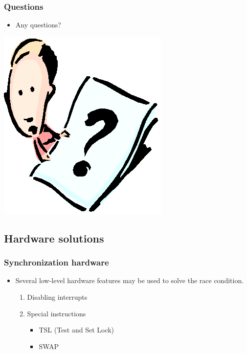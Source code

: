 \documentclass[CJKutf8,xcolor=pdftex,dvipsnames,table]{beamer}
\begin{document}
\begin{CJK*}{UTF8}{song}
  \begin{frame}
  \frametitle{Questions}
  \begin{itemize}
  \item{Any questions?}
  \end{itemize}
  \begin{center}
    \includegraphics[scale=.5]{question}
  \end{center}
  \end{frame}

\subsection{Hardware solutions}

  \begin{frame}
  \frametitle{Synchronization hardware} \pause
  \begin{itemize}
  \item{Several low-level hardware features may be used to solve the race condition.} \pause
    \begin{enumerate}
    \item{Disabling interrupts} \pause
    \item{Special instructions} \pause
      \begin{itemize}
      \item{TSL (Test and Set Lock)} \pause
      \item{SWAP}
      \end{itemize}
    \end{enumerate}
  \end{itemize}
  \end{frame}


\end{CJK*}
\end{document}
